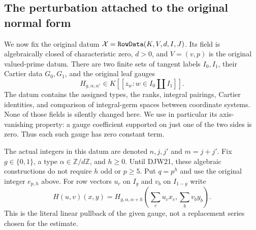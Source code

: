 \documentclass[11pt,a4paper]{article}
\numberwithin{equation}{section}
\theoremstyle{remark}\newtheorem{remark}[theorem]{Remark}
\begin{document}
\subsection{The perturbation attached to the original normal form}

We now fix the original datum
$\mathcal X=\texttt{Row\allowbreak Data}(K,V,d,I,J)$.
Its field is algebraically closed of characteristic zero, $d>0$,
and $V=(v,p)$ is the original valued-prime datum.
There are two finite sets of tangent labels $I_0,I_1$, their
Cartier data $G_0,G_1$, and the original leaf gauges
\[
 H_{g,\alpha,\alpha'}\in
 K[[z_w:w\in I_0\amalg I_1]].
\]
The datum contains the assigned types, the ranks, integral pairings,
Cartier identities, and comparison of integral-germ spaces between
coordinate systems.  None of those fields is silently changed here.
We use in particular its axis-vanishing property: a gauge coefficient
supported on just one of the two sides is zero.  Thus each such
gauge has zero constant term.

The actual integers in this datum are denoted $n,j,j'$ and
$m=j+j'$.  Fix $g\in\{0,1\}$, a type $\alpha\in\mathbb Z/d\mathbb Z$,
and $h\ge0$.  Until DJW21, these algebraic constructions do not
require $h$ odd or $p\ge5$.
Put $q=p^h$ and use the original integer $e_{p,h}$ above.
For row vectors $u_c$ on $I_g$ and $v_b$ on $I_{1-g}$ write
\[
 H(u,v)(x,y)=H_{g,\alpha,\alpha+h}
       \left(\sum_cu_c x_c,\sum_bv_b y_b\right).
\]
This is the literal linear pullback of the given gauge, not a
replacement series chosen for the estimate.
\end{document}
